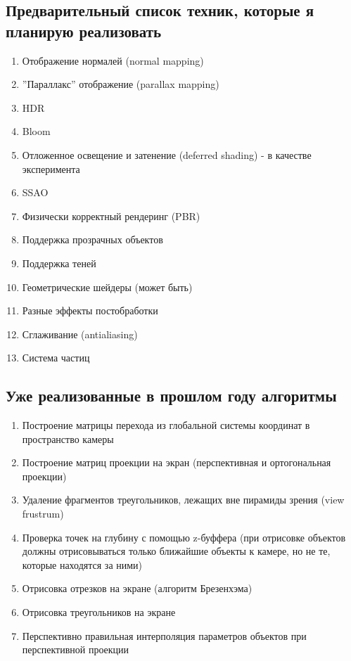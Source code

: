 \documentclass[12pt]{article}
\begin{document}
\subsection{Предварительный список техник, которые я планирую реализовать}
\begin{enumerate}
	\item Отображение нормалей (normal mapping)
	\item ''Параллакс'' отображение (parallax mapping)
	\item HDR
	\item Bloom
	\item Отложенное освещение и затенение (deferred shading) - в качестве эксперимента
	\item SSAO
	\item Физически корректный рендеринг (PBR)
	\item Поддержка прозрачных объектов
	\item Поддержка теней
	\item Геометрические шейдеры (может быть)
	\item Разные эффекты постобработки
	\item Сглаживание (antialiasing)
	\item Система частиц
\end{enumerate}

\subsection{Уже реализованные в прошлом году алгоритмы}
\begin{enumerate}
	\item Построение матрицы перехода из глобальной системы координат в пространство камеры
	\item Построение матриц проекции на экран (перспективная и ортогональная проекции)
	\item Удаление фрагментов треугольников, лежащих вне пирамиды зрения (view frustrum)
	\item Проверка точек на глубину с помощью z-буффера (при отрисовке объектов должны отрисовываться только ближайшие объекты к камере, но не те, которые находятся за ними)
	\item Отрисовка отрезков на экране (алгоритм Брезенхэма)
	\item Отрисовка треугольников на экране
	\item Перспективно правильная интерполяция параметров объектов при перспективной проекции
\end{enumerate}
\end{document}
